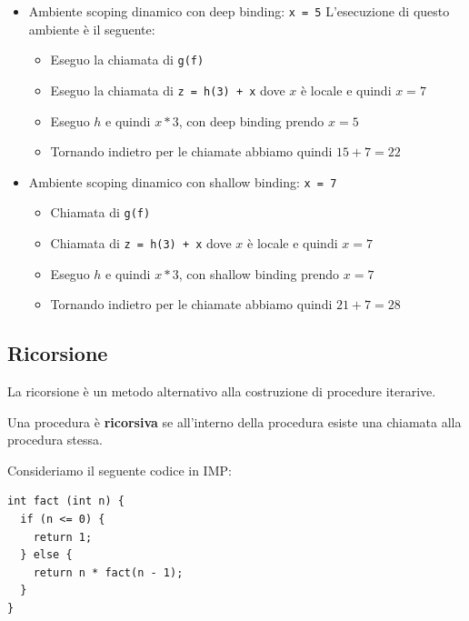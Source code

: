 \documentclass[a4paper]{article}
\begin{document}
\begin{Example}{}{}
\begin{itemize}
\begin{itemize}
    \item Si esegue $x * 3$, non locale e quindi scoping statico, prendo $x = 4$ e quindi $4 * 3 = 12$
  \end{itemize}
  \item Ambiente scoping dinamico con deep binding: \texttt{x = 5}
  L'esecuzione di questo ambiente è il seguente:
  \begin{itemize}
    \item Eseguo la chiamata di \texttt{g(f)}
    \item Eseguo la chiamata di \texttt{z = h(3) + x} dove $x$ è locale e quindi $x = 7$
    \item Eseguo $h$ e quindi $x * 3$, con deep binding prendo $x = 5$ 
    \item Tornando indietro per le chiamate abbiamo quindi $15 + 7 = 22$
  \end{itemize}
  \item Ambiente scoping dinamico con shallow binding: \texttt{x = 7}
  \begin{itemize}
    \item Chiamata di \texttt{g(f)}
    \item Chiamata di \texttt{z = h(3) + x} dove $x$ è locale e quindi $x = 7$
    \item Eseguo $h$ e quindi $x * 3$, con shallow binding prendo $x = 7$
    \item Tornando indietro per le chiamate abbiamo quindi $21 + 7 = 28$
  \end{itemize}
\end{itemize}
\end{Example}

\subsection{Ricorsione}

La ricorsione è un metodo alternativo alla costruzione di procedure iterarive.

\dfn{}
{
  Una procedura è \textbf{ricorsiva} se 
  all'interno della procedura esiste una chiamata alla procedura stessa.
}

\begin{Example}{}{}
Consideriamo il seguente codice in IMP:
\begin{lstlisting}
int fact (int n) {
  if (n <= 0) {
    return 1;
  } else {
    return n * fact(n - 1);
  }
}
\end{lstlisting}
\end{Example}
\end{document}
